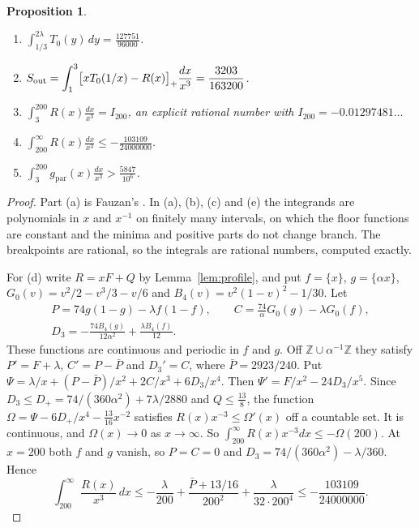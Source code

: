 \documentclass[11pt]{amsart}
\newtheorem{proposition}[theorem]{Proposition}
\theoremstyle{definition}
\theoremstyle{remark}
\numberwithin{equation}{section}
\newcommand{\Z}{\mathbb Z}
\newcommand{\fr}[1]{\{#1\}}
\newcommand{\gref}{g_{\mathrm{par}}}
\begin{document}
\begin{proposition}\label{prop:integrals}
\begin{enumerate}[label=(\alph*)]
\item $\displaystyle\int_{1/3}^{2\lambda}T_0(y)\,dy=\frac{127751}{96000}$.
\item $\displaystyle S_{\rm out}=\int_1^3\bigl[xT_0(1/x)-R(x)\bigr]_+\frac{dx}{x^3}=\frac{3203}{163200}$.
\item $\displaystyle\int_3^{200}R(x)\frac{dx}{x^3}=I_{200}$, an explicit rational number with
 $I_{200}=-0.01297481\ldots$
\item $\displaystyle\int_{200}^\infty R(x)\frac{dx}{x^3}\le-\frac{103109}{24000000}$.
\item $\displaystyle\int_3^{200}\gref(x)\frac{dx}{x^3}>\frac{5847}{10^6}$.
\end{enumerate}
\end{proposition}

\begin{proof}
Part (a) is Fauzan's \cite[(5.10)]{Fauzan2026}. In (a), (b), (c) and (e) the integrands are polynomials in $x$ and
$x^{-1}$ on finitely many intervals, on which the floor functions are constant and the minima and positive parts do not
change branch. The breakpoints are rational, so the integrals are rational numbers, computed exactly.

For (d) write $R=xF+Q$ by Lemma~\ref{lem:profile}, and put $f=\fr x$, $g=\fr{\alpha x}$, $G_0(v)=v^2/2-v^3/3-v/6$ and
$B_4(v)=v^2(1-v)^2-1/30$. Let
\begin{gather*}
 P=74g(1-g)-\lambda f(1-f),\qquad C=\tfrac{74}{\alpha}G_0(g)-\lambda G_0(f),\\
 D_3=-\frac{74B_4(g)}{12\alpha^2}+\frac{\lambda B_4(f)}{12}.
\end{gather*}
These functions are continuous and periodic in $f$ and $g$. Off $\Z\cup\alpha^{-1}\Z$ they satisfy $P'=F+\lambda$,
$C'=P-\bar P$ and $D_3'=C$, where $\bar P=2923/240$. Put $\Psi=\lambda/x+(P-\bar P)/x^2+2C/x^3+6D_3/x^4$. Then
$\Psi'=F/x^2-24D_3/x^5$. Since $D_3\le D_+=74/(360\alpha^2)+7\lambda/2880$ and $Q\le\frac{13}8$, the function
$\Omega=\Psi-6D_+/x^4-\frac{13}{16}x^{-2}$ satisfies $R(x)x^{-3}\le\Omega'(x)$ off a countable set. It is continuous,
and $\Omega(x)\to0$ as $x\to\infty$. So $\int_{200}^\infty R(x)x^{-3}dx\le-\Omega(200)$. At $x=200$ both $f$ and $g$
vanish, so $P=C=0$ and $D_3=74/(360\alpha^2)-\lambda/360$. Hence
\[
 \int_{200}^\infty\frac{R(x)}{x^3}\,dx\le-\frac\lambda{200}+\frac{\bar P+13/16}{200^2}+\frac{\lambda}{32\cdot200^4}
 \le-\frac{103109}{24000000}.
\]
\end{proof}
\end{document}
